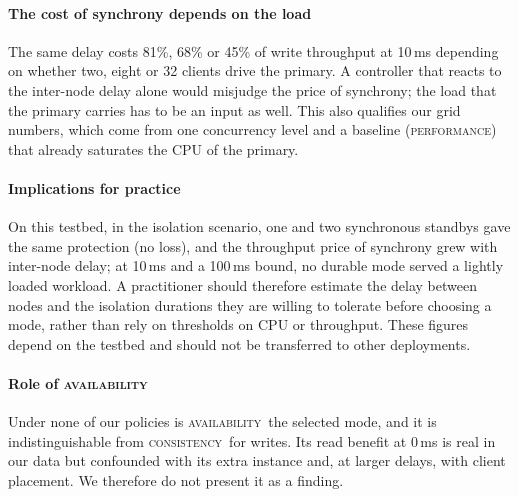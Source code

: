 \documentclass[smallextended]{svjour3}
\newcommand{\perf}{\textsc{performance}}
\newcommand{\cons}{\textsc{consistency}}
\newcommand{\avail}{\textsc{availability}}
\begin{document}
\paragraph{The cost of synchrony depends on the load}
The same delay costs 81\%, 68\% or 45\% of write throughput at 10\,ms depending on whether two, eight or 32 clients drive the primary. A controller that reacts to the inter-node delay alone would misjudge the price of synchrony; the load that the primary carries has to be an input as well. This also qualifies our grid numbers, which come from one concurrency level and a baseline (\perf) that already saturates the CPU of the primary.

\paragraph{Implications for practice}
On this testbed, in the isolation scenario, one and two synchronous standbys gave the same protection (no loss), and the throughput price of synchrony grew with inter-node delay; at 10\,ms and a 100\,ms bound, no durable mode served a lightly loaded workload. A practitioner should therefore estimate the delay between nodes and the isolation durations they are willing to tolerate before choosing a mode, rather than rely on thresholds on CPU or throughput. These figures depend on the testbed and should not be transferred to other deployments.

\paragraph{Role of \avail}
Under none of our policies is \avail\ the selected mode, and it is indistinguishable from \cons\ for writes. Its read benefit at 0\,ms is real in our data but confounded with its extra instance and, at larger delays, with client placement. We therefore do not present it as a finding.
\end{document}
